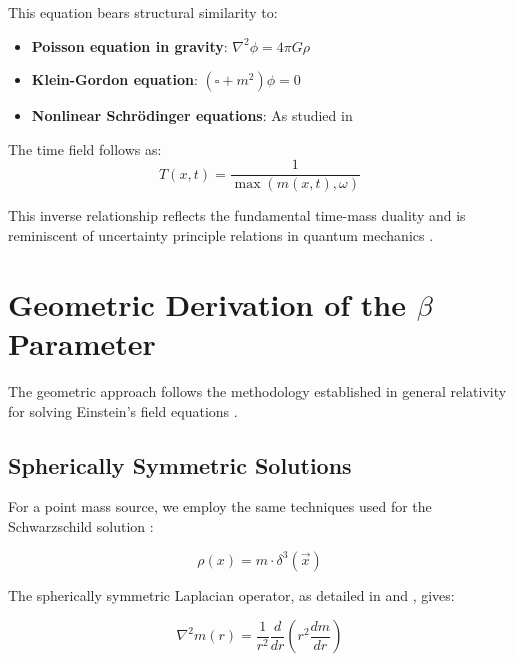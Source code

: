 \documentclass[12pt,a4paper]{article}
\newcommand{\vecx}{\vec{x}}
\begin{document}
	This equation bears structural similarity to:
	\begin{itemize}
		\item \textbf{Poisson equation in gravity}: $\nabla^2 \phi = 4\pi G \rho$ \citep{jackson1998}
		\item \textbf{Klein-Gordon equation}: $(\square + m^2)\phi = 0$ \citep{peskin1995}
		\item \textbf{Nonlinear Schrödinger equations}: As studied in \citep{sulem1999}
	\end{itemize}
	
	The time field follows as:
	\begin{equation}
		\label{eq:time_field_definition}
		T(x,t) = \frac{1}{\max(m(x,t), \omega)}
	\end{equation}
	
	This inverse relationship reflects the fundamental time-mass duality and is reminiscent of uncertainty principle relations in quantum mechanics \citep{heisenberg1927,griffiths2004}.
	
	\section{Geometric Derivation of the $\beta$ Parameter}
	\label{sec:beta_derivation}
	
	The geometric approach follows the methodology established in general relativity for solving Einstein's field equations \citep{schwarzschild1916,misner1973,carroll2004}.
	
	\subsection{Spherically Symmetric Solutions}
	\label{subsec:spherical_solutions}
	
	For a point mass source, we employ the same techniques used for the Schwarzschild solution \citep{schwarzschild1916,weinberg1972}:
	
	\begin{equation}
		\rho(x) = m \cdot \delta^3(\vecx)
	\end{equation}
	
	The spherically symmetric Laplacian operator, as detailed in \citet{jackson1998} and \citet{griffiths1999}, gives:
	
	\begin{equation}
		\nabla^2 m(r) = \frac{1}{r^2}\frac{d}{dr}\left(r^2 \frac{dm}{dr}\right)
	\end{equation}
	
\end{document}
